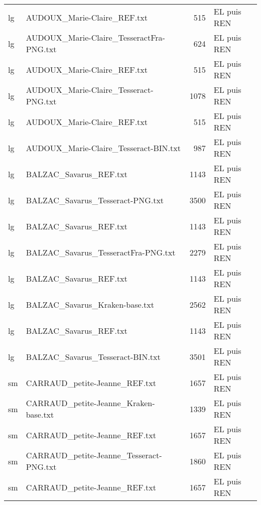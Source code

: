 \begin{tabular}{llrl}
    lg &                        AUDOUX\_Marie-Claire\_REF.txt &                   515 & EL puis REN \\
    lg &           AUDOUX\_Marie-Claire\_TesseractFra-PNG.txt &                   624 & EL puis REN \\
    lg &                        AUDOUX\_Marie-Claire\_REF.txt &                   515 & EL puis REN \\
    lg &              AUDOUX\_Marie-Claire\_Tesseract-PNG.txt &                  1078 & EL puis REN \\
    lg &                        AUDOUX\_Marie-Claire\_REF.txt &                   515 & EL puis REN \\
    lg &              AUDOUX\_Marie-Claire\_Tesseract-BIN.txt &                   987 & EL puis REN \\
    lg &                             BALZAC\_Savarus\_REF.txt &                  1143 & EL puis REN \\
    lg &                   BALZAC\_Savarus\_Tesseract-PNG.txt &                  3500 & EL puis REN \\
    lg &                             BALZAC\_Savarus\_REF.txt &                  1143 & EL puis REN \\
    lg &                BALZAC\_Savarus\_TesseractFra-PNG.txt &                  2279 & EL puis REN \\
    lg &                             BALZAC\_Savarus\_REF.txt &                  1143 & EL puis REN \\
    lg &                     BALZAC\_Savarus\_Kraken-base.txt &                  2562 & EL puis REN \\
    lg &                             BALZAC\_Savarus\_REF.txt &                  1143 & EL puis REN \\
    lg &                   BALZAC\_Savarus\_Tesseract-BIN.txt &                  3501 & EL puis REN \\
    sm &                      CARRAUD\_petite-Jeanne\_REF.txt &                  1657 & EL puis REN \\
    sm &              CARRAUD\_petite-Jeanne\_Kraken-base.txt &                  1339 & EL puis REN \\
    sm &                      CARRAUD\_petite-Jeanne\_REF.txt &                  1657 & EL puis REN \\
    sm &            CARRAUD\_petite-Jeanne\_Tesseract-PNG.txt &                  1860 & EL puis REN \\
    sm &                      CARRAUD\_petite-Jeanne\_REF.txt &                  1657 & EL puis REN \\

\end{tabular}

